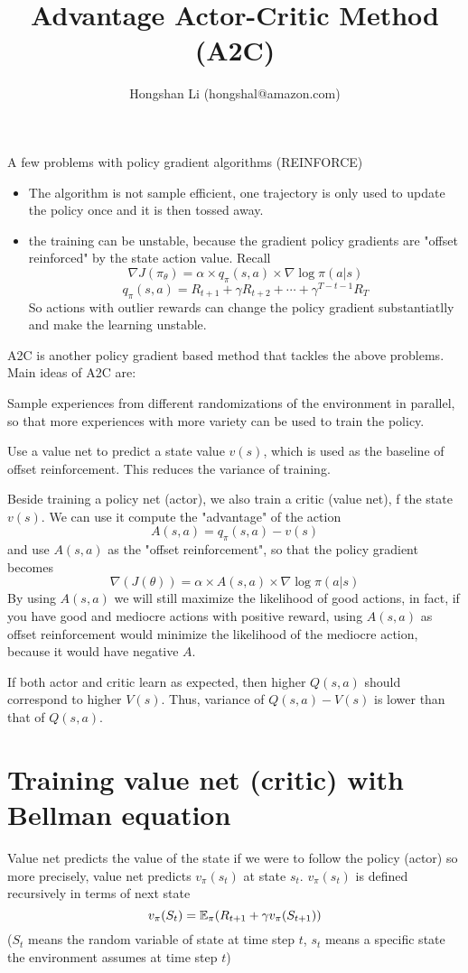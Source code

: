 \documentclass{article}
\title{Advantage Actor-Critic Method (A2C)}
\author{Hongshan Li (hongshal@amazon.com)}
\begin{document}
\maketitle

A few problems with policy gradient algorithms (REINFORCE)
\begin{itemize}
    \item The algorithm is not sample efficient, one trajectory
        is only used to update the policy once and it is then
        tossed away.
    \item the training can be unstable, because the gradient 
        policy gradients are "offset reinforced" by the
        state action value. Recall
        \[
            \nabla J(\pi_{\theta}) = \alpha \times q_{\pi}(s,a) 
            \times \nabla \log\pi(a|s)
        \]
        \[
            q_{\pi}(s, a) = R_{t+1} + \gamma R_{t+2} + \cdots + 
                \gamma^{T-t-1}R_T
        \]
        So actions with outlier rewards can change the policy gradient
        substantiatlly and make the learning unstable. 
\end{itemize}

    
A2C is another policy gradient based method that tackles the above problems. 
Main ideas of A2C are:

Sample experiences from different randomizations of the environment 
in parallel, so that more experiences with more variety can be used 
to train the policy. 

Use a value net to predict a state value $v(s)$, which is used as 
the baseline of offset reinforcement. This reduces the variance 
of training.

Beside training a policy net (actor), we also train a critic (value net),
f the state $v(s)$. We can use it compute the 
"advantage" of the action
\[
  A(s, a) = q_{\pi}(s, a) - v(s)
\]
and use $A(s, a)$ as the "offset reinforcement", so that the policy gradient 
becomes
\[
  \nabla(J(\theta)) = \alpha \times A(s, a) \times \nabla\log\pi(a|s)
\]
By using $A(s, a)$ we will still maximize the likelihood of good actions,
in fact, if you have good and mediocre actions with positive reward, 
using $A(s, a)$ as offset reinforcement would minimize the likelihood
of the mediocre action, because it would have negative $A$. 

If both actor and critic learn as expected, then higher $Q(s, a)$ 
should correspond to higher $V(s)$. Thus, variance of $Q(s, a) - V(s)$
is lower than that of $Q(s,a)$. 

\section{Training value net (critic) with Bellman equation}
Value net predicts the value of the state if we were to follow the policy (actor)
so more precisely, value net predicts $v_{\pi}(s_t)$ at state $s_t$. 
$v_{\pi}(s_t)$ is defined recursively in terms of next state
\[
  v_{\pi}(S_t) = \mathbb{E}_{\pi}(R_{t+1} + \gamma v_{\pi}(S_{t+1}))
\]
($S_t$ means the random variable of state at time step $t$, $s_t$ means 
a specific state the environment assumes at time step $t$)
\end{document}
